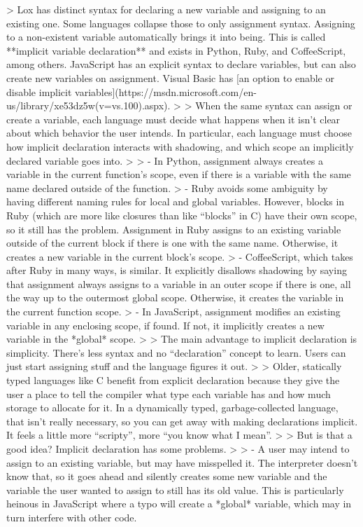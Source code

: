 \documentclass[cn,11pt,chinese]{elegantbook}
\begin{document}
{> Lox has distinct syntax for declaring a new variable and assigning to an existing one. Some languages collapse those to only assignment syntax. Assigning to a non-existent variable automatically brings it into being. This is called **implicit variable declaration** and exists in Python, Ruby, and CoffeeScript, among others. JavaScript has an explicit syntax to declare variables, but can also create new variables on assignment. Visual Basic has [an option to enable or disable implicit variables](https://msdn.microsoft.com/en-us/library/xe53dz5w(v=vs.100).aspx).
>
> When the same syntax can assign or create a variable, each language must decide what happens when it isn’t clear about which behavior the user intends. In particular, each language must choose how implicit declaration interacts with shadowing, and which scope an implicitly declared variable goes into.
>
> - In Python, assignment always creates a variable in the current function’s scope, even if there is a variable with the same name declared outside of the function.
> - Ruby avoids some ambiguity by having different naming rules for local and global variables. However, blocks in Ruby (which are more like closures than like “blocks” in C) have their own scope, so it still has the problem. Assignment in Ruby assigns to an existing variable outside of the current block if there is one with the same name. Otherwise, it creates a new variable in the current block’s scope.
> - CoffeeScript, which takes after Ruby in many ways, is similar. It explicitly disallows shadowing by saying that assignment always assigns to a variable in an outer scope if there is one, all the way up to the outermost global scope. Otherwise, it creates the variable in the current function scope.
> - In JavaScript, assignment modifies an existing variable in any enclosing scope, if found. If not, it implicitly creates a new variable in the *global* scope.
>
> The main advantage to implicit declaration is simplicity. There’s less syntax and no “declaration” concept to learn. Users can just start assigning stuff and the language figures it out.
>
> Older, statically typed languages like C benefit from explicit declaration because they give the user a place to tell the compiler what type each variable has and how much storage to allocate for it. In a dynamically typed, garbage-collected language, that isn’t really necessary, so you can get away with making declarations implicit. It feels a little more “scripty”, more “you know what I mean”.
>
> But is that a good idea? Implicit declaration has some problems.
>
> - A user may intend to assign to an existing variable, but may have misspelled it. The interpreter doesn’t know that, so it goes ahead and silently creates some new variable and the variable the user wanted to assign to still has its old value. This is particularly heinous in JavaScript where a typo will create a *global* variable, which may in turn interfere with other code.
}
\end{document}
